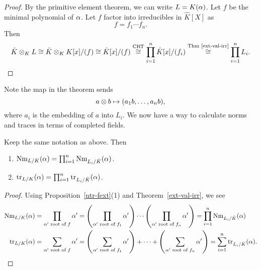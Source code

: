 \begin{proof}
By the primitive element theorem, %
we can write $L=K(\alpha)$. Let $f$ be the minimal polynomial of $\alpha$. Let $f$ factor into irreducibles in $\hat K[X]$ as
\[
f=f_1\cdots f_n.
\]
Then
\[
\hat K\otimes_K L\cong \hat K\otimes_K K[x]/(f)\cong \hat K[x]/(f)\stackrel{\text{CRT}}{\cong} \prod_{i=1}^n \hat K[x]/(f_i)
\stackrel{\text{Thm~\ref{ext-val-irr}}}{\cong} \prod_{i=1}^n L_i.\qedhere
\]
\end{proof}
Note the map in the theorem sends 
\[
a\otimes b\mapsto (a_1b,\ldots, a_nb),
\]
where $a_i$ is the embedding of $a$ into $L_i$.
We now have a way to calculate norms and traces in terms of completed fields.
\begin{cor}
Keep the same notation as above. Then
\begin{enumerate}
\item $\operatorname{Nm}_{L/K}(\alpha)=\prod_{i=1}^n \operatorname{Nm}_{L_i/\hat K}(\alpha)$.
\item $\operatorname{tr}_{L/K}(\alpha)=\prod_{i=1}^n \operatorname{tr}_{L_i/\hat K}(\alpha)$.
\end{enumerate}
\end{cor}
\begin{proof}
Using Proposition~\ref{ntr-fext}(1) and Theorem~\ref{ext-val-irr}, we see
\begin{align*}
\operatorname{Nm}_{L/K}(\alpha)&=\prod_{\alpha'\text{ root of }f}\alpha'=\left( {\prod_{\alpha'\text{ root of }f_1}\alpha'} \right)\cdots \left( {\prod_{\alpha'\text{ root of }f_n}\alpha'} \right)
=\prod_{i=1}^n \operatorname{Nm}_{L_i/\hat K}(\alpha)\\
\operatorname{tr}_{L/K}(\alpha)&=\sum_{\alpha'\text{ root of }f}\alpha'=\left( {\sum_{\alpha'\text{ root of }f_1}\alpha'} \right)+\cdots+ \left( {\sum_{\alpha'\text{ root of }f_n}\alpha'} \right)
=\sum_{i=1}^n \operatorname{tr}_{L_i/\hat K}(\alpha).
\end{align*}
\end{proof}

